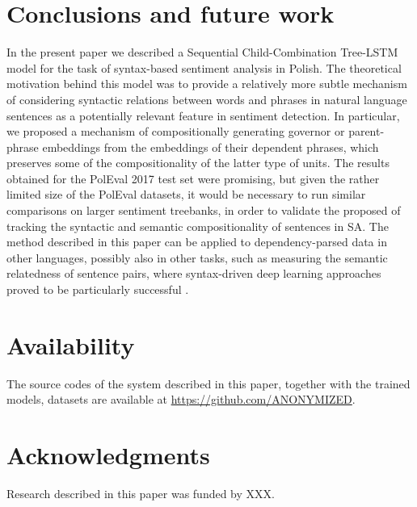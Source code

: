 \documentclass[10pt, a4paper]{article}
\begin{document}
\section{Conclusions and future work}

In the present paper we described a Sequential Child-Combination Tree-LSTM model for the task of syntax-based sentiment analysis in Polish. The theoretical motivation behind this model was to provide a relatively more subtle mechanism of considering syntactic relations between words and phrases in natural language sentences as a potentially relevant feature in sentiment detection. In particular, we proposed a mechanism of compositionally generating governor or parent-phrase embeddings from the embeddings of their dependent phrases, which preserves some of the compositionality of the latter type of units. The results obtained for the PolEval 2017 test set were promising, but given the rather limited size of the PolEval datasets, it would be necessary to run similar comparisons on larger sentiment treebanks, in order to validate the proposed  of tracking the syntactic and semantic compositionality of sentences in SA. The method described in this paper can be applied to dependency-parsed data in other languages, possibly also in other tasks, such as measuring the semantic relatedness of sentence pairs, where syntax-driven deep learning approaches proved to be particularly successful \cite{tai2015improved}.
\section{Availability}

The source codes of the system described in this paper, together with the trained models, datasets are available at \url{https://github.com/ANONYMIZED}.


\section{Acknowledgments}

Research described in this paper was funded by XXX.


 
\end{document}

